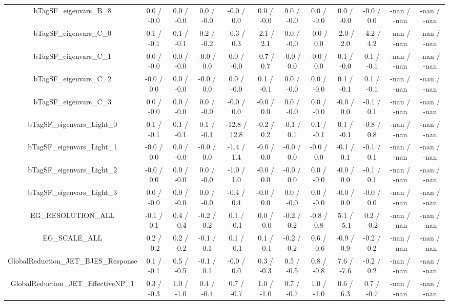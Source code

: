 \begin{table}[htbp]
\begin{center}
\begin{tabular}{|c|c|c|c|c|c|c|c|c|c|c|c|}
  bTagSF_eigenvars_B_8 & 0.0 / -0.0 & 0.0 / -0.0 & 0.0 / -0.0 & -0.0 / 0.0 & 0.0 / -0.0 & 0.0 / -0.0 & 0.0 / -0.0 & 0.0 / -0.0 & -0.0 / 0.0 & -nan / -nan & -nan / -nan \\ 
  bTagSF_eigenvars_C_0 & 0.1 / -0.1 & 0.1 / -0.1 & 0.2 / -0.2 & -0.3 / 0.3 & -2.1 / 2.1 & 0.0 / -0.0 & -0.0 / 0.0 & -2.0 / 2.0 & -4.2 / 4.2 & -nan / -nan & -nan / -nan \\ 
  bTagSF_eigenvars_C_1 & 0.0 / -0.0 & 0.0 / -0.0 & -0.0 / 0.0 & 0.0 / -0.0 & -0.7 / 0.7 & -0.0 / 0.0 & -0.0 / 0.0 & 0.1 / -0.0 & 0.1 / -0.1 & -nan / -nan & -nan / -nan \\ 
  bTagSF_eigenvars_C_2 & -0.0 / 0.0 & 0.0 / -0.0 & -0.0 / 0.0 & 0.0 / -0.0 & 0.1 / -0.1 & 0.0 / -0.0 & 0.0 / -0.0 & 0.1 / -0.1 & 0.1 / -0.1 & -nan / -nan & -nan / -nan \\ 
  bTagSF_eigenvars_C_3 & 0.0 / -0.0 & 0.0 / -0.0 & 0.0 / -0.0 & -0.0 / 0.0 & -0.0 / 0.0 & 0.0 / -0.0 & 0.0 / -0.0 & -0.0 / 0.0 & -0.1 / 0.1 & -nan / -nan & -nan / -nan \\ 
  bTagSF_eigenvars_Light_0 & 0.1 / -0.1 & 0.1 / -0.1 & 0.1 / -0.1 & -12.8 / 12.8 & -0.2 / 0.2 & -0.1 / 0.1 & 0.1 / -0.1 & 0.1 / -0.1 & -0.8 / 0.8 & -nan / -nan & -nan / -nan \\ 
  bTagSF_eigenvars_Light_1 & -0.0 / 0.0 & 0.0 / -0.0 & -0.0 / 0.0 & -1.4 / 1.4 & -0.0 / 0.0 & -0.0 / 0.0 & -0.0 / 0.0 & -0.1 / 0.1 & -0.1 / 0.1 & -nan / -nan & -nan / -nan \\ 
  bTagSF_eigenvars_Light_2 & -0.0 / 0.0 & 0.0 / -0.0 & 0.0 / -0.0 & -1.0 / 1.0 & -0.0 / 0.0 & -0.0 / 0.0 & 0.0 / -0.0 & -0.0 / 0.0 & -0.1 / 0.1 & -nan / -nan & -nan / -nan \\ 
  bTagSF_eigenvars_Light_3 & 0.0 / -0.0 & 0.0 / -0.0 & 0.0 / -0.0 & -0.4 / 0.4 & -0.0 / 0.0 & 0.0 / -0.0 & 0.0 / -0.0 & -0.0 / 0.0 & -0.0 / 0.0 & -nan / -nan & -nan / -nan \\ 
  EG_RESOLUTION_ALL & -0.1 / 0.1 & 0.4 / -0.4 & -0.2 / 0.2 & 0.1 / -0.1 & 0.0 / -0.0 & -0.2 / 0.2 & -0.8 / 0.8 & 5.1 / -5.1 & 0.2 / -0.2 & -nan / -nan & -nan / -nan \\ 
  EG_SCALE_ALL & 0.2 / -0.2 & 0.2 / -0.2 & -0.1 / 0.1 & 0.1 / -0.1 & 0.1 / -0.1 & -0.2 / 0.2 & 0.6 / -0.6 & -0.9 / 0.9 & -0.2 / 0.2 & -nan / -nan & -nan / -nan \\ 
  GlobalReduction_JET_BJES_Response & 0.1 / -0.1 & 0.5 / -0.5 & -0.1 / 0.1 & -0.0 / 0.0 & 0.3 / -0.3 & 0.5 / -0.5 & 0.8 / -0.8 & 7.6 / -7.6 & -0.2 / 0.2 & -nan / -nan & -nan / -nan \\ 
  GlobalReduction_JET_EffectiveNP_1 & 0.3 / -0.3 & 1.0 / -1.0 & 0.4 / -0.4 & 0.7 / -0.7 & 1.0 / -1.0 & 0.7 / -0.7 & 1.0 / -1.0 & 0.6 / 6.3 & 0.7 / -0.7 & -nan / -nan & -nan / -nan \\ 

\end{tabular}
\end{center}
\end{table}
